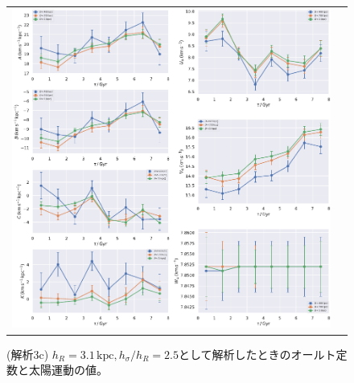 \begin{figure}
   \centering
\begin{tabular}{cc}
\includegraphics[width=16cm]{fig/3c.pdf}
\end{tabular}
    \caption{(解析3c) $h_R=3.1\,\mathrm{kpc}, h_{\sigma}/h_R=2.5$として解析したときのオールト定数と太陽運動の値。}
    \label{figObs3c}
\end{figure}






